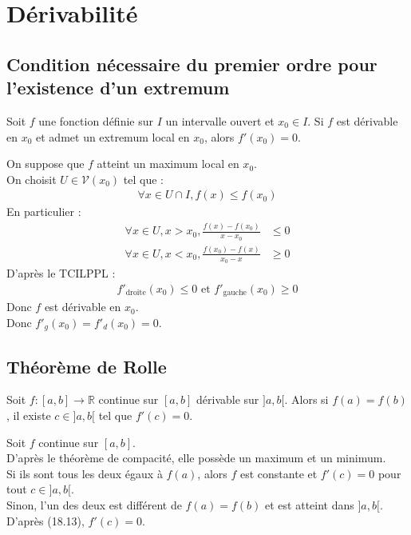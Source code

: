 \documentclass[../main.tex]{subfiles}
\begin{document}
\setcounter{chapter}{17}
\chapter{Dérivabilité}
\tableofcontents
\clearpage

\section{Condition nécessaire du premier ordre pour l'existence d'un extremum}
\begin{tcolorbox}[title=Théorème 18.13, title filled=false, colframe=orange, colback=orange!10!white]
    Soit $f$ une fonction définie sur $I$ un intervalle ouvert et $x_0 \in I$. Si $f$ est dérivable en $x_0$ et admet un extremum local en $x_0$, alors $f'(x_0) = 0$. 
\end{tcolorbox}

\noindent On suppose que $f$ atteint un maximum local en $x_0$. \\
On choisit $U \in \mathcal V(x_0)$ tel que : 
\begin{align*}
    \forall x \in U \cap I, f(x) \leq f(x_0)
\end{align*}
En particulier : 
\begin{align*}
    \forall x \in U, x > x_0, \frac{f(x) - f(x_0)}{x - x_0} &\leq 0 \\
    \forall x \in U, x < x_0, \frac{f(x_0) - f(x)}{x_0 - x} &\geq 0
\end{align*}
D'après le TCILPPL : 
\begin{align*}
    f'_{\text{droite}}(x_0) \leq 0 \text{ et } f'_{\text{gauche}}(x_0) \geq 0
\end{align*}
Donc $f$ est dérivable en $x_0$. \\
Donc $f'_g(x_0) = f'_d(x_0) = 0$. 

\section{Théorème de Rolle}
\begin{tcolorbox}[title=Théorème 18.17, title filled=false, colframe=orange, colback=orange!10!white]
    Soit $f:[a, b] \to \mathbb{R}$ continue sur $[a, b]$ dérivable sur $]a, b[$. Alors si $f(a) = f(b)$, il existe $c\in ]a, b[$ tel que $f'(c) = 0$. 
\end{tcolorbox}

\noindent Soit $f$ continue sur $[a, b]$. \\
D'après le théorème de compacité, elle possède un maximum et un minimum. \\
Si ils sont tous les deux égaux à $f(a)$, alors $f$ est constante et $f'(c) = 0$ pour tout $c\in ]a, b[$. \\
Sinon, l'un des deux est différent de $f(a) = f(b)$ et est atteint dans $]a, b[$. \\
D'après (18.13), $f'(c) = 0$. 
\end{document}
